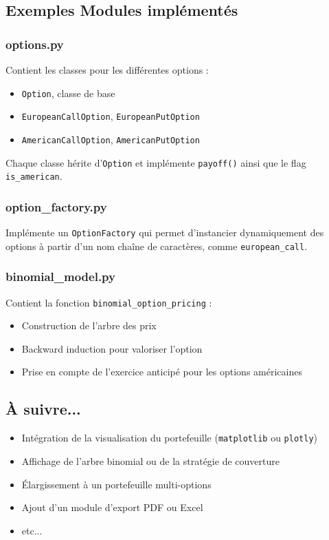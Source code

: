 \documentclass[a4paper,11pt]{article}
\begin{document}
\subsection{Exemples Modules implémentés}

\subsubsection{options.py}
Contient les classes pour les différentes options :
\begin{itemize}
    \item \texttt{Option}, classe de base
    \item \texttt{EuropeanCallOption}, \texttt{EuropeanPutOption}
    \item \texttt{AmericanCallOption}, \texttt{AmericanPutOption}
\end{itemize}

Chaque classe hérite d'\texttt{Option} et implémente \texttt{payoff()} ainsi que le flag \texttt{is\_american}.

\subsubsection{option\_factory.py}
Implémente un \texttt{OptionFactory} qui permet d’instancier dynamiquement des options à partir d’un nom chaîne de caractères, comme \texttt{european\_call}.

\subsubsection{binomial\_model.py}
Contient la fonction \texttt{binomial\_option\_pricing} :
\begin{itemize}
    \item Construction de l’arbre des prix
    \item Backward induction pour valoriser l’option
    \item Prise en compte de l’exercice anticipé pour les options américaines
\end{itemize}

\subsection{À suivre...}
\begin{itemize}
    \item Intégration de la visualisation du portefeuille (\texttt{matplotlib} ou \texttt{plotly})
    \item Affichage de l’arbre binomial ou de la stratégie de couverture
    \item Élargissement à un portefeuille multi-options
    \item Ajout d’un module d’export PDF ou Excel
    \item etc...
\end{itemize}
\end{document}
